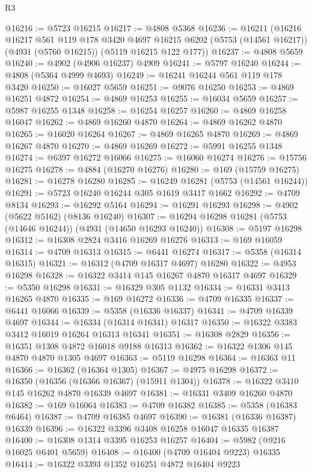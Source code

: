 \begin{lexlean}{R3}
\begin{coremodule}
@16216 := @5723 @16215
@16217 := @4808 @5368
@16236 := @16211
    (@16216
      @16217
      @561
      @119
      @178
      @3420
      @4697
      @16215
      @6202
      (@5753 (@14561 @16217))
      (@4931 (@5760 @16215))
      (@5119 @16215 @122 @177))
@16237 := @4808 @5659
@16240 := @4902 (@4906 @16237) @4909
@16241 := @5797 @16240
@16244 := @4808 (@5364 @4999 @4693)
@16249 := @16241 @16244 @561 @119 @178 @3420
@16250 := @16027 @5659
@16251 := @9076 @16250
@16253 := @4869 @16251 @4872
@16254 := @4869 @16253
@16255 := @16034 @5659
@16257 := @5987 @16255 @1348
@16258 := @16254 @16257
@16260 := @4869 @16258 @16047
@16262 := @4869 @16260 @4870
@16264 := @4869 @16262 @4870
@16265 := @16020 @16264
@16267 := @4869 @16265 @4870
@16269 := @4869 @16267 @4870
@16270 := @4869 @16269
@16272 := @5991 @16255 @1348
@16274 := @6397 @16272 @16066
@16275 := @16060 @16274
@16276 := @15756 @16275
@16278 := @4884 (@16270 @16276)
@16280 := @169 (@15759 @16275)
@16281 := @16278 @16280
@16285 := @16249 @16281 (@5753 (@14561 @16244))
@16291 := @5723 @16240 @16244 @305 @1619 @3417 @1662
@16292 := @4709 @8134
@16293 := @16292 @5164
@16294 := @16291 @16293
@16298 := @4902 (@5622 @5162) (@8136 @16240)
@16307 := @16294 @16298 @16281 (@5753 (@14646 @16244)) (@4931 (@14650 @16293 @16240))
@16308 := @5197 @16298
@16312 := @16308 @2824 @3416 @16269 @16276
@16313 := @169 @16059
@16314 := @4709 @16313
@16315 := @6441 @16274
@16317 := @5358 (@16314 @16315)
@16321 := @16312 (@4709 @16317 @4697) @16280
@16322 := @4953 @16298
@16328 := @16322 @3414 @145 @16267 @4870 @16317 @4697
@16329 := @5350 @16298
@16331 := @16329 @305 @1132
@16334 := @16331 @3413 @16265 @4870
@16335 := @169 @16272
@16336 := @4709 @16335
@16337 := @6441 @16066
@16339 := @5358 (@16336 @16337)
@16341 := @4709 @16339 @4697
@16344 := @16334 (@16314 @16341) @16317
@16350 := @16322 @3383 @3412 @16019 @16264 @16313 @16341
@16351 := @16308 @2829
@16356 := @16351 @1308 @4872 @16018 @9188 @16313
@16362 := @16322 @1306 @145 @4870 @4870 @1305 @4697
@16363 := @5119 @16298
@16364 := @16363 @11
@16366 := @16362 (@16364 @1305)
@16367 := @4975 @16298
@16372 := @16350 (@16356 (@16366 @16367) (@15911 @1304))
@16378 := @16322 @3410 @145 @16262 @4870 @16339 @4697
@16381 := @16331 @3409 @16260 @4870
@16382 := @169 @16064
@16383 := @4709 @16382
@16385 := @5358 (@16383 @6464)
@16387 := @4709 @16385 @4697
@16390 := @16381 (@16336 @16387) @16339
@16396 := @16322 @3396 @3408 @16258 @16047 @16335 @16387
@16400 := @16308 @1314 @3395 @16253 @16257
@16404 := @5982 (@9216 @16025 @6401 @5659)
@16408 := @16400 (@4709 @16404 @9223) @16335
@16414 := @16322 @3393 @1352 @16251 @4872 @16404 @9223

\end{coremodule}
\end{lexlean}
